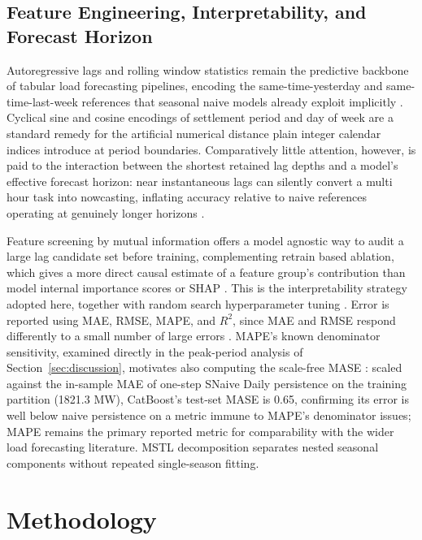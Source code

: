 \documentclass[runningheads]{llncs}
\begin{document}
\subsection{Feature Engineering, Interpretability, and Forecast Horizon}

Autoregressive lags and rolling window statistics remain the predictive backbone of tabular load forecasting pipelines, encoding the same-time-yesterday and same-time-last-week references that seasonal naive models already exploit implicitly \cite{deb2017review}. Cyclical sine and cosine encodings of settlement period and day of week are a standard remedy for the artificial numerical distance plain integer calendar indices introduce at period boundaries. Comparatively little attention, however, is paid to the interaction between the shortest retained lag depths and a model's effective forecast horizon: near instantaneous lags can silently convert a multi hour task into nowcasting, inflating accuracy relative to naive references operating at genuinely longer horizons \cite{bergmeir2012use}.

Feature screening by mutual information \cite{kraskov2004estimating} offers a model agnostic way to audit a large lag candidate set before training, complementing retrain based ablation, which gives a more direct causal estimate of a feature group's contribution than model internal importance scores or SHAP \cite{lundberg2017unified}. This is the interpretability strategy adopted here, together with random search hyperparameter tuning \cite{bergstra2012random}. Error is reported using MAE, RMSE, MAPE, and $R^2$, since MAE and RMSE respond differently to a small number of large errors \cite{willmott2005advantages}. MAPE's known denominator sensitivity, examined directly in the peak-period analysis of Section~\ref{sec:discussion}, motivates also computing the scale-free MASE \cite{hyndman2006another}: scaled against the in-sample MAE of one-step SNaive Daily persistence on the training partition (1821.3 MW), CatBoost's test-set MASE is 0.65, confirming its error is well below naive persistence on a metric immune to MAPE's denominator issues; MAPE remains the primary reported metric for comparability with the wider load forecasting literature. MSTL decomposition \cite{bandara2021mstl} separates nested seasonal components without repeated single-season fitting.

\section{Methodology}
\label{sec:methodology}
\end{document}
